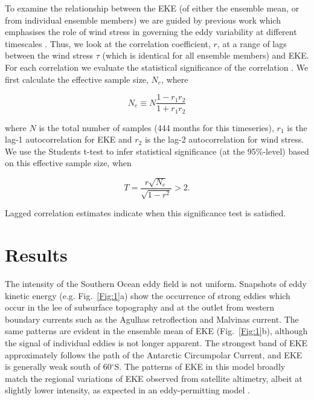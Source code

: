 \documentclass{agujournal2019}
\begin{document}
To examine the relationship between the EKE (of either the ensemble mean, or from individual ensemble members) we are guided by previous work which emphasises the role of wind stress in governing the eddy variability at different timescales \citep[e.g.][]{Hogg2015, Sinha2016}.
Thus, we look at the correlation coefficient, $r$, at a range of lags between the wind stress $\tau$ (which is identical for all ensemble members) and EKE.
For each correlation we evaluate the statistical significance of the correlation \citep[following, e.g.][]{Santer2000}.
We first calculate the effective sample size, $N_e$, where
\begin{linenomath*}
\begin{equation}
N_e \equiv N \frac{1-r_1 r_2}{1+r_1 r_2}
\end{equation}
\end{linenomath*}
where $N$ is the total number of samples (444 months for this timeseries), $r_1$ is the lag-1 autocorrelation for EKE and $r_2$ is the lag-2 autocorrelation for wind stress.
We use the Students t-test to infer statistical significance (at the 95\%-level) based on this effective sample size, when
\begin{linenomath*}
\begin{equation}
T = \frac{r \sqrt{N_e}}{\sqrt{1-r^2}} > 2.
\end{equation}
\end{linenomath*}
Lagged correlation estimates indicate when this significance test is satisfied.

\section{Results}

The intensity of the Southern Ocean eddy field is not uniform.
Snapshots of eddy kinetic energy (e.g. Fig.~\ref{Fig:1}a) show the occurrence of strong eddies which occur in the lee of subsurface topography and at the outlet from western boundary currents such as the Agulhas retroflection and Malvinas current.
The same patterns are evident in the ensemble mean of EKE (Fig.~\ref{Fig:1}b), although the signal of individual eddies is not longer apparent.
The strongest band of EKE approximately follows the path of the Antarctic Circumpolar Current, and EKE is generally weak south of 60$^\circ$S.
The patterns of EKE in this model broadly match the regional variations of EKE observed from satellite altimetry, albeit at slightly lower intensity, as expected in an eddy-permitting model \citep[e.g.][]{Kiss2020}.
\end{document}
